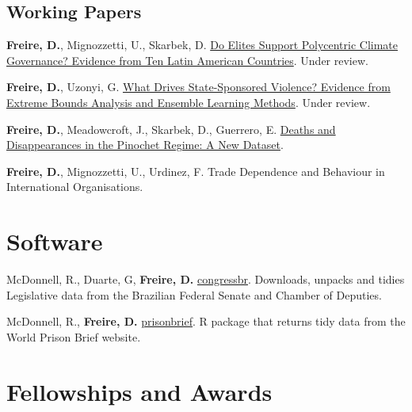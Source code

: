 \documentclass[a4paper]{article}
\renewenvironment{itemize}{
  \begin{list}{}{
    \setlength{\leftmargin}{1.5em}
  }
}{
  \end{list}
}
\begin{document}
\subsection*{Working Papers}

\begin{itemize}
	\item \textbf{Freire, D.}, Mignozzetti, U., Skarbek, D. \href{https://osf.io/9a6ch}{Do Elites Support Polycentric Climate Governance? Evidence from Ten Latin American Countries}. Under review.
    \item \textbf{Freire, D.}, Uzonyi, G. \href{https://osf.io/pzx3q}{What Drives State-Sponsored Violence? Evidence from Extreme Bounds Analysis and Ensemble Learning Methods}. Under review.
    \item \textbf{Freire, D.}, Meadowcroft, J., Skarbek, D., Guerrero, E.  \href{https://osf.io/rm4y8/}{Deaths and Disappearances in the Pinochet Regime: A New Dataset}. 
	\item \textbf{Freire, D.}, Mignozzetti, U., Urdinez, F. Trade Dependence and Behaviour in International Organisations. 
\end{itemize}

\section*{Software}

\begin{itemize}
	\item McDonnell, R., Duarte, G, \textbf{Freire, D.} \href{https://cran.r-project.org/package=congressbr}{congressbr}. Downloads, unpacks and tidies Legislative data from the Brazilian Federal Senate and Chamber of Deputies.
	\item McDonnell, R., \textbf{Freire, D.} \href{http://danilofreire.github.io/prisonbrief/}{prisonbrief}. R package that returns tidy data from the World Prison Brief website. 
\end{itemize}

\section*{Fellowships and Awards}
\end{document}
